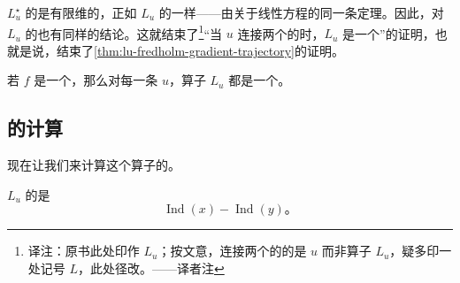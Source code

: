 $L_{u}^{\star}$ 的\trKernel{}是有限维的，正如 $L_{u}$ 的\trKernel{}一样——由关于线性\trDifferential{}方程的同一条定理。因此，对 $L_{u}$ 的\trCokernel{}也有同样的结论。这就结束了\footnote{译注：原书此处印作 $L_{u}$；按文意，连接两个\trNondegenerate{}的\trCriticalPoint{}的是\trTrajectory{} $u$ 而非算子 $L_{u}$，疑多印一处记号 $L$，此处径改。——译者注}“当 $u$ 连接两个\trNondegenerate{}的\trCriticalPoint{}时，$L_{u}$ 是一个\trFredholmOperator”的证明，也就是说，结束了\cref{thm:lu-fredholm-gradient-trajectory}的证明。

\begin{corollary}\label{thm:lu-fredholm-morse}
若 $f$ 是一个\trMorseFunction，那么对每一条\trTrajectory{} $u$，算子 $L_{u}$ 都是一个\trFredholmOperator。
\end{corollary}
\noqed

\subsection{\trIndex{}的计算}
\label{subsec:index-computation-lu}

现在让我们来计算这个算子的\trIndex。

\begin{proposition}\label{thm:lu-index-morse-difference}
\trFredholmOperator{} $L_{u}$ 的\trIndex{}是
\[ \operatorname{Ind}(x)-\operatorname{Ind}(y)\text{。} \]
\end{proposition}

